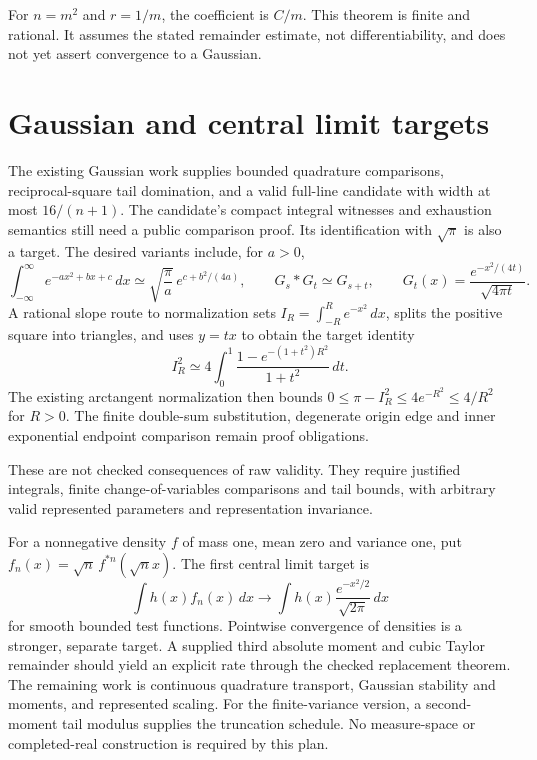 For $n=m^2$ and $r=1/m$, the coefficient is $C/m$. This theorem is finite
and rational. It assumes the stated remainder estimate, not differentiability,
and does not yet assert convergence to a Gaussian.

\section{Gaussian and central limit targets}

The existing Gaussian work supplies bounded quadrature comparisons,
reciprocal-square tail domination, and a valid full-line candidate with
width at most $16/(n+1)$. The candidate's compact integral witnesses and
exhaustion semantics still need a public comparison proof. Its identification
with $\sqrt\pi$ is also a target. The desired variants include, for $a>0$,
\[
 \int_{-\infty}^{\infty}e^{-ax^2+bx+c}\,dx
 \simeq\sqrt{\frac\pi a}\,e^{c+b^2/(4a)},
 \qquad G_s*G_t\simeq G_{s+t},
 \qquad G_t(x)=\frac{e^{-x^2/(4t)}}{\sqrt{4\pi t}}.
\]
A rational slope route to normalization sets
$I_R=\int_{-R}^R e^{-x^2}\,dx$, splits the positive square into triangles,
and uses $y=tx$ to obtain the target identity
\[
 I_R^2\simeq4\int_0^1\frac{1-e^{-(1+t^2)R^2}}{1+t^2}\,dt.
\]
The existing arctangent normalization then bounds
$0\le\pi-I_R^2\le4e^{-R^2}\le4/R^2$ for $R>0$.
The finite double-sum substitution, degenerate origin edge and inner
exponential endpoint comparison remain proof obligations.

These are not checked consequences of raw validity. They require justified
integrals, finite change-of-variables comparisons and tail bounds, with
arbitrary valid represented parameters and representation invariance.

For a nonnegative density $f$ of mass one, mean zero and variance one, put
$f_n(x)=\sqrt n\,f^{*n}(\sqrt n x)$. The first central limit target is
\[
 \int h(x)f_n(x)\,dx\longrightarrow
 \int h(x)\frac{e^{-x^2/2}}{\sqrt{2\pi}}\,dx
\]
for smooth bounded test functions. Pointwise convergence of densities is a
stronger, separate target. A supplied third absolute moment and cubic Taylor
remainder should yield an explicit rate through the checked replacement
theorem. The remaining work is continuous quadrature transport, Gaussian
stability and moments, and represented scaling. For the finite-variance
version, a second-moment tail modulus supplies the truncation schedule.
No measure-space or completed-real construction is required by this plan.
